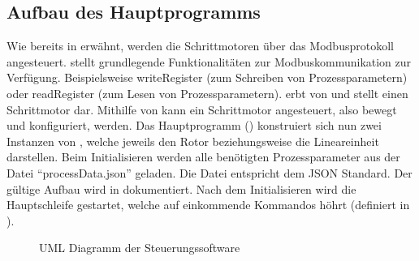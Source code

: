 \documentclass[letterpaper,10pt,english]{sphinxmanual}
\begin{document}
\subsection{Aufbau des Hauptprogramms}
\label{_xfcberblick:aufbau-des-hauptprogramms}
Wie bereits in {\hyperref[_xfcberblick:modbus\string-rs\string-485]{}} erwähnt, werden die Schrittmotoren über das Modbusprotokoll angesteuert.
{\hyperref[minimalmodbus:module\string-minimalmodbus]{}} stellt grundlegende Funktionalitäten zur Modbuskommunikation zur Verfügung. Beispielsweise
writeRegister (zum Schreiben von Prozessparametern) oder readRegister (zum Lesen von Prozessparametern).
{\hyperref[stepperMotor:module\string-stepperMotor]{}} erbt von {\hyperref[minimalmodbus:module\string-minimalmodbus]{}} und stellt einen Schrittmotor dar. Mithilfe von
{\hyperref[stepperMotor:module\string-stepperMotor]{}} kann ein Schrittmotor angesteuert, also bewegt und konfiguriert, werden. Das Hauptprogramm
({\hyperref[bohrvorrichtung:module\string-bohrvorrichtung]{}}) konstruiert sich nun zwei Instanzen von {\hyperref[stepperMotor:module\string-stepperMotor]{}}, welche jeweils den
Rotor beziehungsweise die Lineareinheit darstellen. Beim Initialisieren werden alle benötigten
Prozessparameter aus der Datei ``processData.json'' geladen. Die Datei entspricht dem JSON Standard.
Der gültige Aufbau wird in {\hyperref[bohrvorrichtung:module\string-bohrvorrichtung]{}} dokumentiert. Nach dem Initialisieren wird die
Hauptschleife gestartet, welche auf einkommende Kommandos höhrt (definiert in {\hyperref[commands:module\string-commands]{}}).
\begin{figure}[htbp]
\centering
\capstart

\noindent{}
\caption{UML Diagramm der Steuerungssoftware}\label{_xfcberblick:id4}\end{figure}
\end{document}

